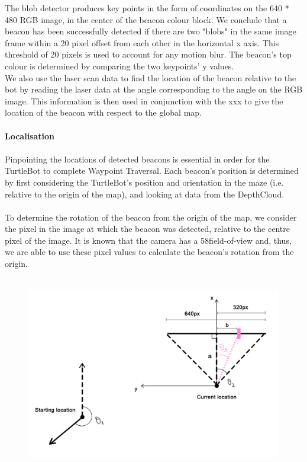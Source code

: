 \documentclass[titlepage,12pt,a4paper]{article}
\begin{document}
\noindent The blob detector produces key points in the form of coordinates on the 640 * 480 RGB image, in the center of the beacon colour block. We conclude that a beacon has been successfully detected if there are two "blobs" in the same image frame within a 20 pixel offset from each other in the horizontal x axis. This threshold of 20 pixels is used to account for any motion blur. The beacon's top colour is determined by comparing the two keypoints' y values.\\

\noindent We also use the laser scan data to find the location of the beacon relative to the bot by reading the laser data at the angle corresponding to the angle on the RGB image. This information is then used in conjunction with the xxx to give the location of the beacon with respect to the global map. \\

\large{\textbf{\\Localisation}} \\
\normalsize
\\
Pinpointing the locations of detected beacons is essential in order for the TurtleBot to complete Waypoint Traversal. Each beacon's position is determined by first considering the TurtleBot's position and orientation in the maze (i.e. relative to the origin of the map), and looking at data from the DepthCloud. \\
\\
To determine the rotation of the beacon from the origin of the map, we consider the pixel in the image at which the beacon was detected, relative to the centre pixel of the image. It is known that the camera has a 58\degree field-of-view and, thus, we are able to use these pixel values to calculate the beacon's rotation from the origin. \\
\\
\begin{figure}[h]
	\includegraphics[scale=0.3]{beacon.jpg}
\end{figure}
\end{document}
